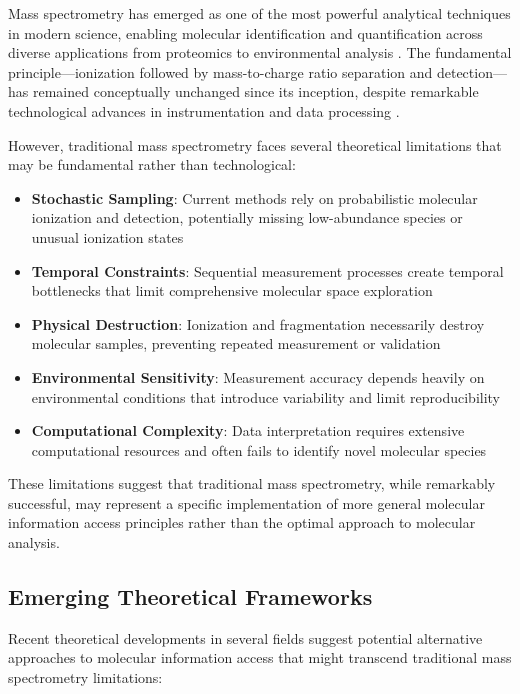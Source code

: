 \documentclass[11pt,a4paper]{article}
\theoremstyle{remark}
\begin{document}
Mass spectrometry has emerged as one of the most powerful analytical techniques in modern science, enabling molecular identification and quantification across diverse applications from proteomics to environmental analysis \cite{hoffmann2007mass,gross2017mass}. The fundamental principle—ionization followed by mass-to-charge ratio separation and detection—has remained conceptually unchanged since its inception, despite remarkable technological advances in instrumentation and data processing \cite{mclafferty1993interpretation}.

However, traditional mass spectrometry faces several theoretical limitations that may be fundamental rather than technological:

\begin{itemize}
\item \textbf{Stochastic Sampling}: Current methods rely on probabilistic molecular ionization and detection, potentially missing low-abundance species or unusual ionization states \cite{bantscheff2007quantitative}
\item \textbf{Temporal Constraints}: Sequential measurement processes create temporal bottlenecks that limit comprehensive molecular space exploration \cite{ludwig2018data}
\item \textbf{Physical Destruction}: Ionization and fragmentation necessarily destroy molecular samples, preventing repeated measurement or validation \cite{zubarev2013electron}
\item \textbf{Environmental Sensitivity}: Measurement accuracy depends heavily on environmental conditions that introduce variability and limit reproducibility \cite{taylor2019systematic}
\item \textbf{Computational Complexity}: Data interpretation requires extensive computational resources and often fails to identify novel molecular species \cite{duhrkop2019sirius}
\end{itemize}

These limitations suggest that traditional mass spectrometry, while remarkably successful, may represent a specific implementation of more general molecular information access principles rather than the optimal approach to molecular analysis.

\subsection{Emerging Theoretical Frameworks}

Recent theoretical developments in several fields suggest potential alternative approaches to molecular information access that might transcend traditional mass spectrometry limitations:
\end{document}
